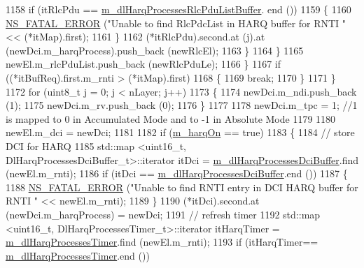 \begin{DoxyCode}
1158                       \textcolor{keywordflow}{if} (itRlcPdu == \hyperlink{classns3_1_1TdBetFfMacScheduler_a066bceddaca3ed4a25974ada3aba3028}{m\_dlHarqProcessesRlcPduListBuffer}.
      end ())
1159                         \{
1160                           \hyperlink{group__fatal_ga5131d5e3f75d7d4cbfd706ac456fdc85}{NS\_FATAL\_ERROR} (\textcolor{stringliteral}{"Unable to find RlcPdcList in HARQ buffer for RNTI 
      "} << (*itMap).first);
1161                         \}
1162                       (*itRlcPdu).second.at (j).at (newDci.m\_harqProcess).push\_back (newRlcEl);
1163                     \}
1164                 \}
1165               newEl.m\_rlcPduList.push\_back (newRlcPduLe);
1166             \}
1167           \textcolor{keywordflow}{if} ((*itBufReq).first.m\_rnti > (*itMap).first)
1168             \{
1169               \textcolor{keywordflow}{break};
1170             \}
1171         \}
1172       \textcolor{keywordflow}{for} (uint8\_t j = 0; j < nLayer; j++)
1173         \{
1174           newDci.m\_ndi.push\_back (1);
1175           newDci.m\_rv.push\_back (0);
1176         \}
1177 
1178       newDci.m\_tpc = 1; \textcolor{comment}{//1 is mapped to 0 in Accumulated Mode and to -1 in Absolute Mode}
1179 
1180       newEl.m\_dci = newDci;
1181 
1182       \textcolor{keywordflow}{if} (\hyperlink{classns3_1_1TdBetFfMacScheduler_a8de90c082c621bf8d664fff8cf370acb}{m\_harqOn} == \textcolor{keyword}{true})
1183         \{
1184           \textcolor{comment}{// store DCI for HARQ}
1185           std::map <uint16\_t, DlHarqProcessesDciBuffer\_t>::iterator itDci = 
      \hyperlink{classns3_1_1TdBetFfMacScheduler_a94ed0382052c7b9665c5f04bce88fe6e}{m\_dlHarqProcessesDciBuffer}.find (newEl.m\_rnti);
1186           \textcolor{keywordflow}{if} (itDci == \hyperlink{classns3_1_1TdBetFfMacScheduler_a94ed0382052c7b9665c5f04bce88fe6e}{m\_dlHarqProcessesDciBuffer}.end ())
1187             \{
1188               \hyperlink{group__fatal_ga5131d5e3f75d7d4cbfd706ac456fdc85}{NS\_FATAL\_ERROR} (\textcolor{stringliteral}{"Unable to find RNTI entry in DCI HARQ buffer for RNTI "} << 
      newEl.m\_rnti);
1189             \}
1190           (*itDci).second.at (newDci.m\_harqProcess) = newDci;
1191           \textcolor{comment}{// refresh timer}
1192           std::map <uint16\_t, DlHarqProcessesTimer\_t>::iterator itHarqTimer =  
      \hyperlink{classns3_1_1TdBetFfMacScheduler_a6421f37924ac8b08b528aec9e7386678}{m\_dlHarqProcessesTimer}.find (newEl.m\_rnti);
1193           \textcolor{keywordflow}{if} (itHarqTimer== \hyperlink{classns3_1_1TdBetFfMacScheduler_a6421f37924ac8b08b528aec9e7386678}{m\_dlHarqProcessesTimer}.end ())

\end{DoxyCode}
